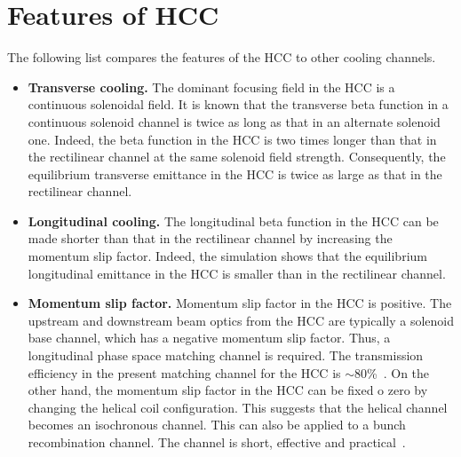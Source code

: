 \documentclass[11pt]{article}
\begin{document}
\section{Features of HCC} 
The following list compares the features of the HCC to other cooling channels. 
\begin{itemize}
    \item \textbf{Transverse cooling.}
    The dominant focusing field in the HCC is a continuous solenoidal field. It is known that the transverse beta function in a continuous solenoid channel is twice as long as that in an alternate solenoid one. 
    Indeed, the beta function in the HCC is two times longer than that in the rectilinear channel at the same solenoid field strength. Consequently, the equilibrium transverse emittance in the HCC is twice as large as that in the rectilinear channel. 
    \item \textbf{Longitudinal cooling.}
    The longitudinal beta function in the HCC can be made shorter than that in the rectilinear channel by increasing the momentum slip factor. Indeed, the simulation shows that the equilibrium longitudinal emittance in the HCC is smaller than in the rectilinear channel. 
    \item \textbf{Momentum slip factor.}
    Momentum slip factor in the HCC is positive. The upstream and downstream beam optics from the HCC are typically a solenoid base channel, which has a negative momentum slip factor. 
    Thus, a longitudinal phase space matching channel is required. 
    The transmission efficiency in the present matching channel for the HCC is $\sim$80\%~\cite{Yoshikawa13}. On the other hand, the momentum slip factor in the HCC can be fixed o zero by changing the helical coil configuration. This suggests that the helical channel becomes an isochronous channel. This can also be applied to a bunch recombination channel.  
    The channel is short, effective and practical~\cite{Cary14, Sy15}. 
\end{itemize}
\end{document}
